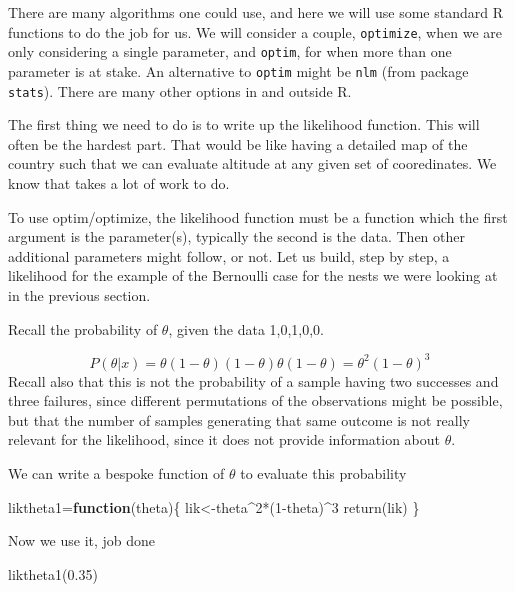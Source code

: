 \documentclass[
]{book}
\newenvironment{Shaded}{\begin{snugshade}}{\end{snugshade}}
\newcommand{\ControlFlowTok}[1]{\textcolor[rgb]{0.13,0.29,0.53}{\textbf{#1}}}
\newcommand{\DecValTok}[1]{\textcolor[rgb]{0.00,0.00,0.81}{#1}}
\newcommand{\FloatTok}[1]{\textcolor[rgb]{0.00,0.00,0.81}{#1}}
\newcommand{\FunctionTok}[1]{\textcolor[rgb]{0.00,0.00,0.00}{#1}}
\newcommand{\NormalTok}[1]{#1}
\newcommand{\OtherTok}[1]{\textcolor[rgb]{0.56,0.35,0.01}{#1}}
\newcommand{\SpecialCharTok}[1]{\textcolor[rgb]{0.00,0.00,0.00}{#1}}
\begin{document}
There are many algorithms one could use, and here we will use some standard R functions to do the job for us. We will consider a couple, \texttt{optimize}, when we are only considering a single parameter, and \texttt{optim}, for when more than one parameter is at stake. An alternative to \texttt{optim} might be \texttt{nlm} (from package \texttt{stats}). There are many other options in and outside R.

The first thing we need to do is to write up the likelihood function. This will often be the hardest part. That would be like having a detailed map of the country such that we can evaluate altitude at any given set of cooredinates. We know that takes a lot of work to do.

To use optim/optimize, the likelihood function must be a function which the first argument is the parameter(s), typically the second is the data. Then other additional parameters might follow, or not. Let us build, step by step, a likelihood for the example of the Bernoulli case for the nests we were looking at in the previous section.

Recall the probability of \(\theta\), given the data 1,0,1,0,0.

\[P(\theta|x)=\theta (1-\theta) (1-\theta) \theta (1-\theta)=\theta^2 (1-\theta)^3\]
Recall also that this is not the probability of a sample having two successes and three failures, since different permutations of the observations might be possible, but that the number of samples generating that same outcome is not really relevant for the likelihood, since it does not provide information about \(\theta\).

We can write a bespoke function of \(\theta\) to evaluate this probability

\begin{Shaded}
\begin{Highlighting}[]
\NormalTok{liktheta1}\OtherTok{=}\ControlFlowTok{function}\NormalTok{(theta)\{}
\NormalTok{  lik}\OtherTok{\textless{}{-}}\NormalTok{theta}\SpecialCharTok{\^{}}\DecValTok{2}\SpecialCharTok{*}\NormalTok{(}\DecValTok{1}\SpecialCharTok{{-}}\NormalTok{theta)}\SpecialCharTok{\^{}}\DecValTok{3}
  \FunctionTok{return}\NormalTok{(lik)}
\NormalTok{\}}
\end{Highlighting}
\end{Shaded}

Now we use it, job done

\begin{Shaded}
\begin{Highlighting}[]
\FunctionTok{liktheta1}\NormalTok{(}\FloatTok{0.35}\NormalTok{)}
\end{Highlighting}
\end{Shaded}
\end{document}
